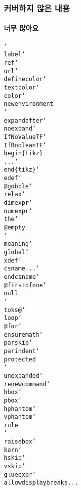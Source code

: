 \begin{frame}[fragile]
  \frametitle{커버하지 않은 내용}
  \framesubtitle{너무 많아요}
  \texttt{\char`\\label\char`\\ref\char`\\url\char`\\definecolor\char`\\textcolor\char`\\color\char`\\newenvironment\\
  \char`\\expandafter\char`\\noexpand\char`\\IfNoValueTF\char`\\IfBooleanTF\char`\\begin\{tikz\}\\
  ...\char`\\end\{tikz\}\char`\\edef\char`\\@gobble\char`\\relax\char`\\dimexpr\char`\\numexpr\char`\\the\char`\\@empty\\
  \char`\\meaning\char`\\global\char`\\xdef\char`\\csname...\char`\\endcsname\char`\\@firstofone\char`\\null\\\char`\\toks@\char`\\loop\char`\\@for\char`\\ensuremath\char`\\parskip\char`\\parindent\char`\\protected\\ \char`\\unexpanded\char`\\renewcommand\char`\\hbox\char`\\pbox\char`\\hphantom\char`\\vphantom\char`\\rule\\\char`\\raisebox\char`\\kern\char`\\hskip\char`\\vskip\char`\\glueexpr\char`\\allowdisplaybreaks...}


\end{frame}
